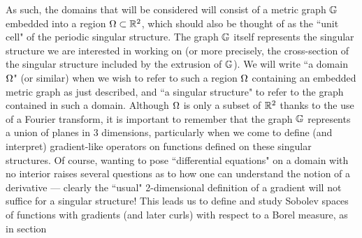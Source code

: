 As such, the domains that will be considered will consist of a metric graph $\mathbb{G}$ embedded into a region $\Omega\subset\mathbb{R}^2$, which should also be thought of as the ``unit cell" of the periodic singular structure.
The graph $\mathbb{G}$ itself represents the singular structure we are interested in working on (or more precisely, the cross-section of the singular structure included by the extrusion of $\mathbb{G}$).
We will write ``a domain $\Omega$" (or similar) when we wish to refer to such a region $\Omega$ containing an embedded metric graph as just described, and ``a singular structure" to refer to the graph contained in such a domain.
Although $\Omega$ is only a subset of $\mathbb{R}^2$ thanks to the use of a Fourier transform, it is important to remember that the graph $\mathbb{G}$ represents a union of planes in 3 dimensions, particularly when we come to define (and interpret) gradient-like operators on functions defined on these singular structures.
Of course, wanting to pose ``differential equations" on a domain with no interior raises several questions as to how one can understand the notion of a derivative --- clearly the ``usual" 2-dimensional definition of a gradient will not suffice for a singular structure!
This leads us to define and study Sobolev spaces of functions with gradients (and later curls) with respect to a Borel measure, as in section 
